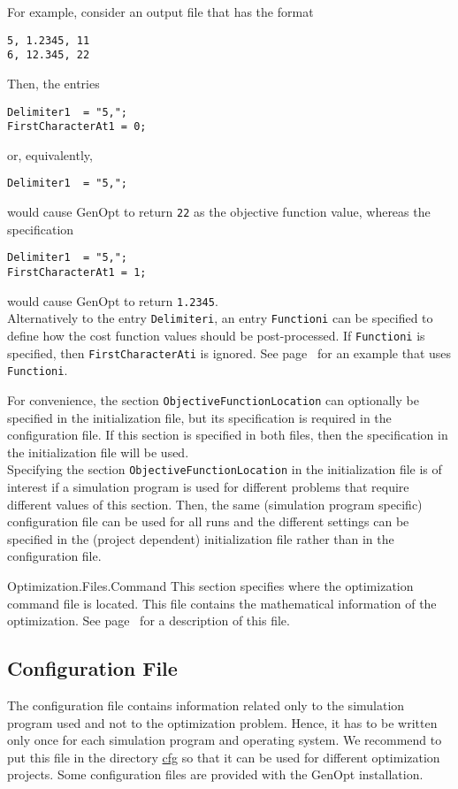 \begin{codedescription}
For example, consider an output file that has the format
\begin{lstlisting}
5, 1.2345, 11
6, 12.345, 22 
\end{lstlisting}
Then, the entries
\begin{lstlisting}
Delimiter1  = "5,";
FirstCharacterAt1 = 0;
\end{lstlisting}
or, equivalently,
\begin{lstlisting}
Delimiter1  = "5,";
\end{lstlisting}
would cause GenOpt to return \verb$22$ as the objective function value, whereas 
the specification
\begin{lstlisting}
Delimiter1  = "5,";
FirstCharacterAt1 = 1;
\end{lstlisting}
would cause GenOpt to return \verb$1.2345$.\\

Alternatively to the entry \verb$Delimiteri$, an entry \verb$Functioni$ can be specified to define how the cost function values should be post-processed. 
If \verb$Functioni$ is specified, then \verb$FirstCharacterAti$ is ignored.
See page~\pageref{par:posPro} for an example that uses \verb$Functioni$.

For convenience, the section \verb$ObjectiveFunctionLocation$ can optionally be specified in the initialization file, but its specification is required in the configuration file. If this section is specified in both files, then the specification in the initialization file will be used.\\

Specifying the section \verb$ObjectiveFunctionLocation$ in the initialization file is of interest if a simulation program is used for different problems that require different values of this section. Then, the same (simulation program specific) configuration file can be used for all runs and the different settings can be specified in the (project dependent) initialization file rather than in the configuration file.

\item[Optimization.Files.Command]
This section specifies where the optimization command file is located. This file contains the mathematical information of the optimization. See page~\pageref{par:comFil} for a description of this file.
\end{codedescription}
\subsection{Configuration File}
The configuration file contains information related only to the simulation program used and not to the optimization problem. Hence, it has to be written only once for each simulation program and operating system.
We recommend to put this file in the directory \url{cfg} so that it can be used for different optimization projects. Some configuration files are provided with the GenOpt installation.\\

